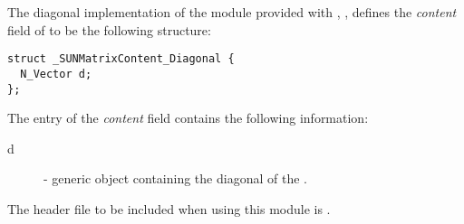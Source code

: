 
The diagonal implementation of the {\sunmatrix} module provided with
{\sundials}, {\sunmatdiag}, defines the {\em content} field
of  to be the following structure:
\begin{verbatim} 
struct _SUNMatrixContent_Diagonal {
  N_Vector d;
};
\end{verbatim}
The entry of the \emph{content} field contains the following
information:
\begin{description}
  \item[d] - generic {\nvector} object containing the diagonal of the
  {\sunmatrix}.
\end{description}

\noindent The header file to be included when using this module 
is . \\

